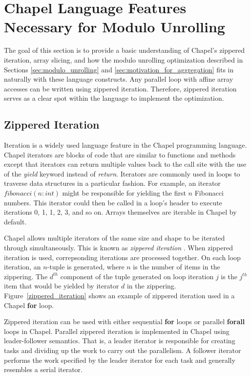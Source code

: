 \section{Chapel Language Features Necessary for Modulo Unrolling}\label{sec:language_features}

The goal of this section is to provide a basic understanding of Chapel's zippered iteration, array slicing, and how the modulo unrolling optimization described in Sections \ref{sec:modulo_unrolling} and \ref{sec:motivation_for_aggregation} fits in naturally with these language constructs. Any parallel loop with affine array accesses can be written using zippered iteration. Therefore, zippered iteration serves as a clear spot within the language to implement the optimization.

\subsection{Zippered Iteration}\label{sec:zippered_iteration}

Iteration is a widely used language feature in the Chapel programming language. Chapel iterators are blocks of code that are similar to functions and methods except that iterators can return multiple values back to the call site with the use of the \textit{yield} keyword instead of \textit{return}. Iterators are commonly used in loops to traverse data structures in a particular fashion. For example, an iterator $fibonacci(n: int)$ might be responsible for yielding the first $n$ Fibonacci numbers. This iterator could then be called in a loop's header to execute iterations 0, 1, 1, 2, 3, and so on. Arrays themselves are iterable in Chapel by default. 

Chapel allows multiple iterators of the same size and shape to be iterated through simultaneously. This is known as \textit{zippered iteration} \cite{chamberlain2011user}. When zippered iteration is used, correpsonding iterations are processed together. On each loop iteration, an $n$-tuple is generated, where $n$ is the number of items in the zippering. The $d^{th}$ component of the tuple generated on loop iteration $j$ is the $j^{th}$ item that would be yielded by iterator $d$ in the zippering. Figure~\ref{zippered_iteration} shows an example of zippered iteration used in a Chapel \textbf{for} loop. 

Zippered iteration can be used with either sequential \textbf{for} loops or parallel \textbf{forall} loops in Chapel. Parallel zippered iteration is implemented in Chapel using leader-follower semantics. That is, a leader iterator is responsible for creating tasks and dividing up the work to carry out the parallelism. A follower iterator performs the work specified by the leader iterator for each task and generally resembles a serial iterator. 

